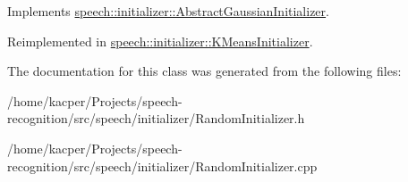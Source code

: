 Implements \hyperlink{classspeech_1_1initializer_1_1AbstractGaussianInitializer_aa32dc879803a574a9bbd04b9f09f9f79}{speech\+::initializer\+::\+Abstract\+Gaussian\+Initializer}.



Reimplemented in \hyperlink{classspeech_1_1initializer_1_1KMeansInitializer_a300e51ef3bca3d566bffb12f2c6f5924}{speech\+::initializer\+::\+K\+Means\+Initializer}.



The documentation for this class was generated from the following files\+:\begin{DoxyCompactItemize}
\item 
/home/kacper/\+Projects/speech-\/recognition/src/speech/initializer/Random\+Initializer.\+h\item 
/home/kacper/\+Projects/speech-\/recognition/src/speech/initializer/Random\+Initializer.\+cpp\end{DoxyCompactItemize}
